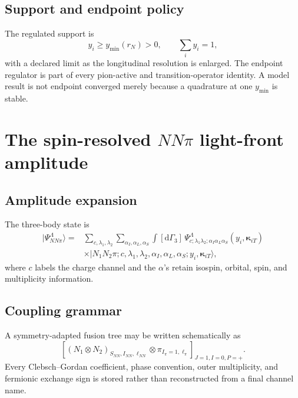 \documentclass[11pt]{article}
\newcommand{\dd}{\mathrm{d}}
\begin{document}
\subsection{Support and endpoint policy}

The regulated support is
\begin{equation}
 y_i\geq y_{\min}(r_N)>0,
 \qquad
 \sum_i y_i=1,
 \label{eq:endpoint-policy}
\end{equation}
with a declared limit as the longitudinal resolution is enlarged.  The
endpoint regulator is part of every pion-active and transition-operator
identity.  A model result is not endpoint converged merely because a
quadrature at one \(y_{\min}\) is stable.

\section{The spin-resolved \texorpdfstring{\(NN\pi\)}{NNpi} light-front amplitude}
\label{sec:amplitude}

\subsection{Amplitude expansion}

The three-body state is
\begin{equation}
 \begin{aligned}
 |\Psi_{NN\pi}^{\Lambda}\rangle
 ={}&
 \sum_{c,\lambda_1,\lambda_2}
 \sum_{\alpha_{I},\alpha_{L},\alpha_{S}}
 \int[\dd\Gamma_3]
 \,\Psi_{c;\lambda_1\lambda_2;
 \alpha_I\alpha_L\alpha_S}^{\Lambda}
 (y_i,\bm\kappa_{iT})
 \\
 &\times
 |N_1N_2\pi;c,\lambda_1,\lambda_2,
 \alpha_I,\alpha_L,\alpha_S;
 y_i,\bm\kappa_{iT}\rangle,
 \end{aligned}
 \label{eq:nnpi-amplitude}
\end{equation}
where \(c\) labels the charge channel and the \(\alpha\)'s retain isospin,
orbital, spin, and multiplicity information.

\subsection{Coupling grammar}

A symmetry-adapted fusion tree may be written schematically as
\begin{equation}
 \left[
 \left(N_1\otimes N_2\right)_{S_{NN},I_{NN},\ell_{NN}}
 \otimes
 \pi_{I_\pi=1,\ell_\pi}
 \right]_{J=1,I=0,P=+}.
 \label{eq:nnpi-fusion-tree}
\end{equation}
Every Clebsch--Gordan coefficient, phase convention, outer multiplicity, and
fermionic exchange sign is stored rather than reconstructed from a final
channel name.
\end{document}
